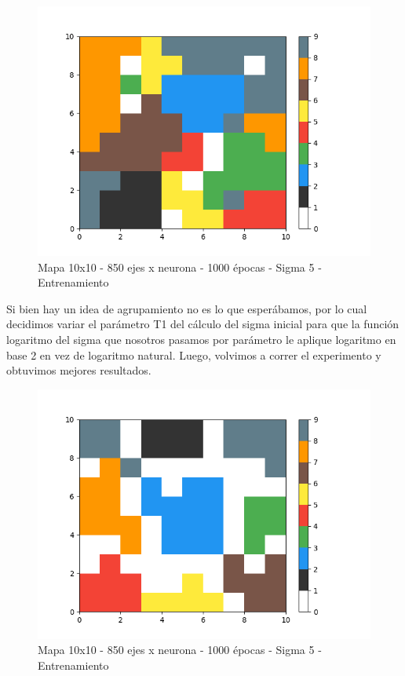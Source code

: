 \begin{figure}[h]
  \begin{center}
    \includegraphics[scale=0.4]{../img/map_1000ep_850en.png}
  \caption{Mapa 10x10 - 850 ejes x neurona - 1000 épocas - Sigma 5 - Entrenamiento}
  \end{center}
\end{figure}

Si bien hay un idea de agrupamiento no es lo que esperábamos, por lo cual decidimos variar el parámetro T1 del cálculo del sigma inicial para que la función logaritmo del sigma que nosotros pasamos por parámetro le aplique logaritmo en base 2 en vez de logaritmo natural. Luego, volvimos a correr el experimento y obtuvimos mejores resultados.

\begin{figure}[h]
  \begin{center}
    \includegraphics[scale=0.4]{../img/map_1000ep_850en_v2.png}
  \caption{Mapa 10x10 - 850 ejes x neurona - 1000 épocas - Sigma 5 - Entrenamiento}
  \end{center}
\end{figure}

